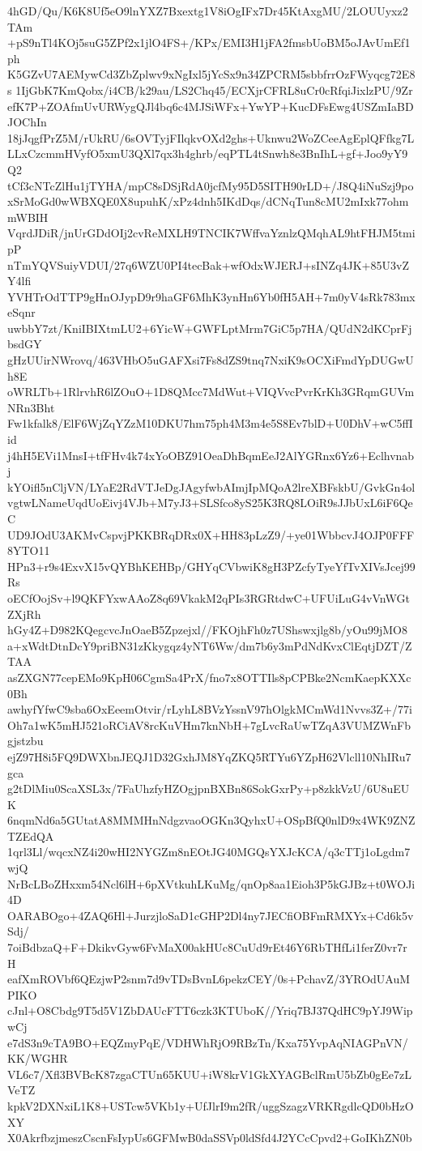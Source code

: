 4hGD/Qu/K6K8Uf5eO9lnYXZ7Bxextg1V8iOgIFx7Dr45KtAxgMU/2LOUUyxz2TAm
+pS9nTl4KOj5suG5ZPf2x1jlO4FS+/KPx/EMI3H1jFA2fmsbUoBM5oJAvUmEf1ph
K5GZvU7AEMywCd3ZbZplwv9xNgIxl5jYcSx9n34ZPCRM5sbbfrrOzFWyqcg72E8s
1IjGbK7KmQobx/i4CB/k29au/LS2Chq45/ECXjrCFRL8uCr0cRfqiJixlzPU/9Zr
efK7P+ZOAfmUvURWygQJl4bq6c4MJSiWFx+YwYP+KucDFsEwg4USZmIaBDJOChIn
18jJqgfPrZ5M/rUkRU/6sOVTyjFIlqkvOXd2ghs+Uknwu2WoZCeeAgEplQFfkg7L
LLxCzcmmHVyfO5xmU3QXl7qx3h4ghrb/eqPTL4tSnwh8e3BnIhL+gf+Joo9yY9Q2
tCf3cNTcZlHu1jTYHA/mpC8sDSjRdA0jcfMy95D5SITH90rLD+/J8Q4iNuSzj9po
xSrMoGd0wWBXQE0X8upuhK/xPz4dnh5IKdDqs/dCNqTun8cMU2mIxk77ohmmWBIH
VqrdJDiR/jnUrGDdOIj2cvReMXLH9TNCIK7WffvaYznlzQMqhAL9htFHJM5tmipP
nTmYQVSuiyVDUI/27q6WZU0PI4tecBak+wfOdxWJERJ+sINZq4JK+85U3vZY4lfi
YVHTrOdTTP9gHnOJypD9r9haGF6MhK3ynHn6Yb0fH5AH+7m0yV4sRk783mxeSqnr
uwbbY7zt/KniIBIXtmLU2+6YicW+GWFLptMrm7GiC5p7HA/QUdN2dKCprFjbsdGY
gHzUUirNWrovq/463VHbO5uGAFXsi7Fs8dZS9tnq7NxiK9sOCXiFmdYpDUGwUh8E
oWRLTb+1RlrvhR6lZOuO+1D8QMcc7MdWut+VIQVvcPvrKrKh3GRqmGUVmNRn3Bht
Fw1kfalk8/ElF6WjZqYZzM10DKU7hm75ph4M3m4e5S8Ev7blD+U0DhV+wC5ffIid
j4hH5EVi1MnsI+tfFHv4k74xYoOBZ91OeaDhBqmEeJ2AlYGRnx6Yz6+Eclhvnabj
kYOifl5nCljVN/LYaE2RdVTJeDgJAgyfwbAImjIpMQoA2lreXBFskbU/GvkGn4ol
vgtwLNameUqdUoEivj4VJb+M7yJ3+SLSfco8yS25K3RQ8LOiR9sJJbUxL6iF6QeC
UD9JOdU3AKMvCspvjPKKBRqDRx0X+HH83pLzZ9/+ye01WbbcvJ4OJP0FFF8YTO11
HPn3+r9s4ExvX15vQYBhKEHBp/GHYqCVbwiK8gH3PZcfyTyeYfTvXIVsJcej99Rs
oECfOojSv+l9QKFYxwAAoZ8q69VkakM2qPIs3RGRtdwC+UFUiLuG4vVnWGtZXjRh
hGy4Z+D982KQegcvcJnOaeB5Zpzejxl//FKOjhFh0z7UShswxjlg8b/yOu99jMO8
a+xWdtDtnDcY9priBN31zKkygqz4yNT6Ww/dm7b6y3mPdNdKvxClEqtjDZT/ZTAA
asZXGN77cepEMo9KpH06CgmSa4PrX/fno7x8OTTIls8pCPBke2NcmKaepKXXc0Bh
awhyfYfwC9sba6OxEeemOtvir/rLyhL8BVzYssnV97hOlgkMCmWd1Nvvs3Z+/77i
Oh7a1wK5mHJ521oRCiAV8rcKuVHm7knNbH+7gLvcRaUwTZqA3VUMZWnFbgjstzbu
ejZ97H8i5FQ9DWXbnJEQJ1D32GxhJM8YqZKQ5RTYu6YZpH62Vlcll10NhIRu7gca
g2tDlMiu0ScaXSL3x/7FaUhzfyHZOgjpnBXBn86SokGxrPy+p8zkkVzU/6U8uEUK
6nqmNd6a5GUtatA8MMMHnNdgzvaoOGKn3QyhxU+OSpBfQ0nlD9x4WK9ZNZTZEdQA
1qrl3Ll/wqcxNZ4i20wHI2NYGZm8nEOtJG40MGQsYXJcKCA/q3cTTj1oLgdm7wjQ
NrBcLBoZHxxm54Ncl6lH+6pXVtkuhLKuMg/qnOp8aa1Eioh3P5kGJBz+t0WOJi4D
OARABOgo+4ZAQ6Hl+JurzjloSaD1cGHP2Dl4ny7JECfiOBFmRMXYx+Cd6k5vSdj/
7oiBdbzaQ+F+DkikvGyw6FvMaX00akHUc8CuUd9rEt46Y6RbTHfLi1ferZ0vr7rH
eafXmROVbf6QEzjwP2snm7d9vTDsBvnL6pekzCEY/0s+PchavZ/3YROdUAuMPIKO
cJnl+O8Cbdg9T5d5V1ZbDAUcFTT6czk3KTUboK//Yriq7BJ37QdHC9pYJ9WipwCj
e7dS3n9cTA9BO+EQZmyPqE/VDHWhRjO9RBzTn/Kxa75YvpAqNIAGPnVN/KK/WGHR
VL6c7/Xfl3BVBcK87zgaCTUn65KUU+iW8krV1GkXYAGBclRmU5bZb0gEe7zLVeTZ
kpkV2DXNxiL1K8+USTcw5VKb1y+UfJlrI9m2fR/uggSzagzVRKRgdlcQD0bHzOXY
X0AkrfbzjmeszCscnFsIypUs6GFMwB0daSSVp0ldSfd4J2YCcCpvd2+GoIKhZN0b
